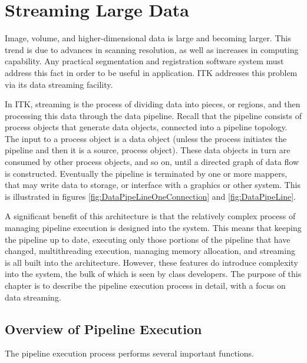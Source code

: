 \section{Streaming Large Data}
\label{sec:StreamingLargeData}

Image, volume, and higher-dimensional data is large and becoming larger. This
trend is due to advances in scanning resolution, as well as increases in
computing capability. Any practical segmentation and registration software
system must address this fact in order to be useful in application. ITK
addresses this problem via its data streaming facility.

In ITK, streaming is the process of dividing data into pieces, or regions,
and then processing this data through the data pipeline. Recall that the
pipeline consists of process objects that generate data objects, connected
into a pipeline topology. The input to a process object is a data object
(unless the process initiates the pipeline and then it is a source, process
object). These data objects in turn are consumed by other process objects,
and so on, until a directed graph of data flow is constructed. Eventually the
pipeline is terminated by one or more mappers, that may write data to
storage, or interface with a graphics or other system. This is illustrated in 
figures \ref{fig:DataPipeLineOneConnection} and \ref{fig:DataPipeLine}.

A significant benefit of this architecture is that the relatively complex
process of managing pipeline execution is designed into the system. This
means that keeping the pipeline up to date, executing only those portions of
the pipeline that have changed, multithreading execution, managing memory
allocation, and streaming is all built into the architecture. However, these
features do introduce complexity into the system, the bulk of which is seen
by class developers. The purpose of this chapter is to describe the pipeline
execution process in detail, with a focus on data streaming.


\subsection{Overview of Pipeline Execution}
\label{sec:OverviewPipelineExecution}

The pipeline execution process performs several important functions.

\begin{figure}
  \par\centering
  \par
\end{figure}

